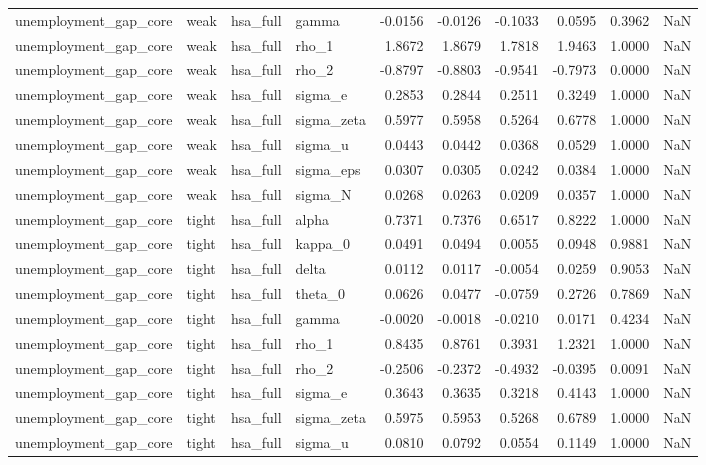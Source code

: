 \begin{tabular}{llllrrrrrl}
unemployment\_gap\_core & weak & hsa\_full & gamma & -0.0156 & -0.0126 & -0.1033 & 0.0595 & 0.3962 & NaN \\
unemployment\_gap\_core & weak & hsa\_full & rho\_1 & 1.8672 & 1.8679 & 1.7818 & 1.9463 & 1.0000 & NaN \\
unemployment\_gap\_core & weak & hsa\_full & rho\_2 & -0.8797 & -0.8803 & -0.9541 & -0.7973 & 0.0000 & NaN \\
unemployment\_gap\_core & weak & hsa\_full & sigma\_e & 0.2853 & 0.2844 & 0.2511 & 0.3249 & 1.0000 & NaN \\
unemployment\_gap\_core & weak & hsa\_full & sigma\_zeta & 0.5977 & 0.5958 & 0.5264 & 0.6778 & 1.0000 & NaN \\
unemployment\_gap\_core & weak & hsa\_full & sigma\_u & 0.0443 & 0.0442 & 0.0368 & 0.0529 & 1.0000 & NaN \\
unemployment\_gap\_core & weak & hsa\_full & sigma\_eps & 0.0307 & 0.0305 & 0.0242 & 0.0384 & 1.0000 & NaN \\
unemployment\_gap\_core & weak & hsa\_full & sigma\_N & 0.0268 & 0.0263 & 0.0209 & 0.0357 & 1.0000 & NaN \\
unemployment\_gap\_core & tight & hsa\_full & alpha & 0.7371 & 0.7376 & 0.6517 & 0.8222 & 1.0000 & NaN \\
unemployment\_gap\_core & tight & hsa\_full & kappa\_0 & 0.0491 & 0.0494 & 0.0055 & 0.0948 & 0.9881 & NaN \\
unemployment\_gap\_core & tight & hsa\_full & delta & 0.0112 & 0.0117 & -0.0054 & 0.0259 & 0.9053 & NaN \\
unemployment\_gap\_core & tight & hsa\_full & theta\_0 & 0.0626 & 0.0477 & -0.0759 & 0.2726 & 0.7869 & NaN \\
unemployment\_gap\_core & tight & hsa\_full & gamma & -0.0020 & -0.0018 & -0.0210 & 0.0171 & 0.4234 & NaN \\
unemployment\_gap\_core & tight & hsa\_full & rho\_1 & 0.8435 & 0.8761 & 0.3931 & 1.2321 & 1.0000 & NaN \\
unemployment\_gap\_core & tight & hsa\_full & rho\_2 & -0.2506 & -0.2372 & -0.4932 & -0.0395 & 0.0091 & NaN \\
unemployment\_gap\_core & tight & hsa\_full & sigma\_e & 0.3643 & 0.3635 & 0.3218 & 0.4143 & 1.0000 & NaN \\
unemployment\_gap\_core & tight & hsa\_full & sigma\_zeta & 0.5975 & 0.5953 & 0.5268 & 0.6789 & 1.0000 & NaN \\
unemployment\_gap\_core & tight & hsa\_full & sigma\_u & 0.0810 & 0.0792 & 0.0554 & 0.1149 & 1.0000 & NaN \\

\end{tabular}
